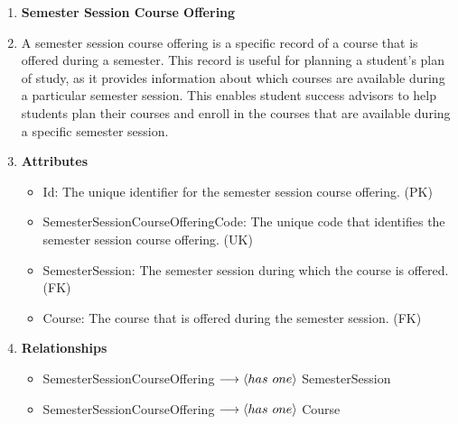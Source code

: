 \documentclass[12pt]{article}
\begin{document}
\begin{appendices}
\begin{enumerate}[label=(\roman*)]
    \item \textbf{Semester Session Course Offering}
    \item[] A semester session course offering is a specific record of a course that is offered during a semester. This record is useful for planning a student's plan of study, as it provides information about which courses are available during a particular semester session. This enables student success advisors to help students plan their courses and enroll in the courses that are available during a specific semester session.
    \item[] \textbf{Attributes}
    \begin{itemize}
        \item Id: The unique identifier for the semester session course offering. (PK)
        \item SemesterSessionCourseOfferingCode: The unique code that identifies the semester session course offering. (UK)
        \item SemesterSession: The semester session during which the course is offered. (FK)
        \item Course: The course that is offered during the semester session. (FK)
    \end{itemize}
    \item[] \textbf{Relationships}
    \begin{itemize}
        \item SemesterSessionCourseOffering $ \longrightarrow \langle has \hspace{0.125cm} one \rangle $ SemesterSession
        \item SemesterSessionCourseOffering $ \longrightarrow \langle has \hspace{0.125cm} one \rangle $ Course
    \end{itemize}


\end{enumerate}
\end{appendices}
\end{document}
